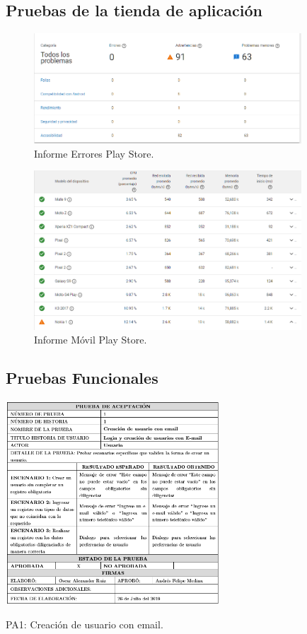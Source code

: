 \documentclass[12pt,letterpaper,openany]{book}
\begin{document}
\subsection{Pruebas de la tienda de aplicación}
\begin{figure}[H]
\begin{center}
\includegraphics[width=10cm]{./imagenes/Test/Informe_errores_play_store}
\caption{Informe Errores Play Store.}
\end{center}
\end{figure}

\begin{figure}[H]
\begin{center}
\includegraphics[width=10cm]{./imagenes/Test/Informe_movile_play_console}
\caption{Informe Móvil Play Store.}
\end{center}
\end{figure}

\subsection{Pruebas Funcionales}
\begin{table}[H]
\centering
\includegraphics[width=8cm]{./imagenes/PA/PA1}
\caption{PA1: Creación de usuario con email.}
\end{table}
\end{document}

